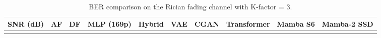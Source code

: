 \documentclass[
  english,
  12pt,
  12pt,
  a4paper,
  oneside]{report}
\begin{document}
\begin{longtable}[]{@{}
  >{\raggedright\arraybackslash}p{}
  >{\raggedright\arraybackslash}p{}
  >{\raggedright\arraybackslash}p{}
  >{\raggedright\arraybackslash}p{}
  >{\raggedright\arraybackslash}p{}
  >{\raggedright\arraybackslash}p{}
  >{\raggedright\arraybackslash}p{}
  >{\raggedright\arraybackslash}p{}
  >{\raggedright\arraybackslash}p{}
  >{\raggedright\arraybackslash}p{}@{}}
\caption{BER comparison on the Rician fading channel with K-factor = 3.}\label{tbl:table3}\tabularnewline
\toprule\noalign{}
\begin{minipage}[b]{\linewidth}\raggedright
SNR (dB)
\end{minipage} & \begin{minipage}[b]{\linewidth}\raggedright
AF
\end{minipage} & \begin{minipage}[b]{\linewidth}\raggedright
DF
\end{minipage} & \begin{minipage}[b]{\linewidth}\raggedright
MLP (169p)
\end{minipage} & \begin{minipage}[b]{\linewidth}\raggedright
Hybrid
\end{minipage} & \begin{minipage}[b]{\linewidth}\raggedright
VAE
\end{minipage} & \begin{minipage}[b]{\linewidth}\raggedright
CGAN
\end{minipage} & \begin{minipage}[b]{\linewidth}\raggedright
Transformer
\end{minipage} & \begin{minipage}[b]{\linewidth}\raggedright
Mamba S6
\end{minipage} & \begin{minipage}[b]{\linewidth}\raggedright
Mamba-2 SSD
\end{minipage} \\
\midrule\noalign{}
\endfirsthead
\toprule\noalign{}
\begin{minipage}[b]{\linewidth}\raggedright

\end{minipage}
\end{longtable}
\end{document}

